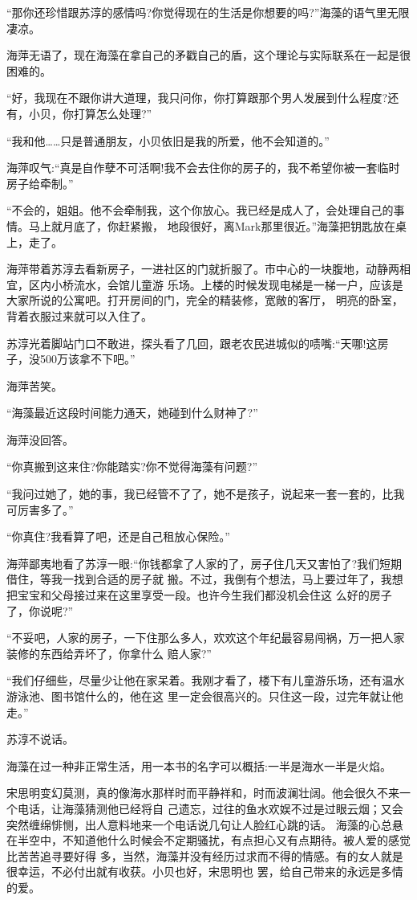 \documentclass[11pt,a4paper,onecolumn]{article}
\begin{document}
``那你还珍惜跟苏淳的感情吗?你觉得现在的生活是你想要的吗?''海藻的语气里无限凄凉。

海萍无语了，现在海藻在拿自己的矛戳自己的盾，这个理论与实际联系在一起是很困难的。

``好，我现在不跟你讲大道理，我只问你，你打算跟那个男人发展到什么程度?还有，小贝，你打算怎么处理?''

``我和他……只是普通朋友，小贝依旧是我的所爱，他不会知道的。''

海萍叹气:``真是自作孽不可活啊!我不会去住你的房子的，我不希望你被一套临时房子给牵制。''

``不会的，姐姐。他不会牵制我，这个你放心。我已经是成人了，会处理自己的事情。马上就月底了，你赶紧搬，
地段很好，离Mark那里很近。''海藻把钥匙放在桌上，走了。

海萍带着苏淳去看新房子，一进社区的门就折服了。市中心的一块腹地，动静两相宜，区内小桥流水，会馆儿童游
乐场。上楼的时候发现电梯是一梯一户，应该是大家所说的公寓吧。打开房间的门，完全的精装修，宽敞的客厅，
明亮的卧室，背着衣服过来就可以入住了。

苏淳光着脚站门口不敢进，探头看了几回，跟老农民进城似的啧嘴:``天哪!这房子，没500万该拿不下吧。''

海萍苦笑。

``海藻最近这段时间能力通天，她碰到什么财神了?''

海萍没回答。

``你真搬到这来住?你能踏实?你不觉得海藻有问题?''

``我问过她了，她的事，我已经管不了了，她不是孩子，说起来一套一套的，比我可厉害多了。''

``你真住?我看算了吧，还是自己租放心保险。''

海萍鄙夷地看了苏淳一眼:``你钱都拿了人家的了，房子住几天又害怕了?我们短期借住，等我一找到合适的房子就
搬。不过，我倒有个想法，马上要过年了，我想把宝宝和父母接过来在这里享受一段。也许今生我们都没机会住这
么好的房子了，你说呢?''

``不妥吧，人家的房子，一下住那么多人，欢欢这个年纪最容易闯祸，万一把人家装修的东西给弄坏了，你拿什么
赔人家?''

``我们仔细些，尽量少让他在家呆着。我刚才看了，楼下有儿童游乐场，还有温水游泳池、图书馆什么的，他在这
里一定会很高兴的。只住这一段，过完年就让他走。''

苏淳不说话。

海藻在过一种非正常生活，用一本书的名字可以概括:一半是海水一半是火焰。

宋思明变幻莫测，真的像海水那样时而平静祥和，时而波澜壮阔。他会很久不来一个电话，让海藻猜测他已经将自
己遗忘，过往的鱼水欢娱不过是过眼云烟；又会突然缠绵悱恻，出人意料地来一个电话说几句让人脸红心跳的话。
海藻的心总悬在半空中，不知道他什么时候会不定期骚扰，有点担心又有点期待。被人爱的感觉比苦苦追寻要好得
多，当然，海藻并没有经历过求而不得的情感。有的女人就是很幸运，不必付出就有收获。小贝也好，宋思明也
罢，给自己带来的永远是多情的爱。
\end{document}
